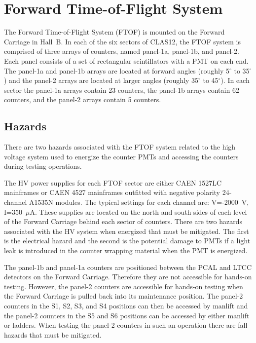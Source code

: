 \section{Forward Time-of-Flight System}

The Forward Time-of-Flight System (FTOF) is mounted on the Forward Carriage in Hall~B. 
In each of the six sectors of CLAS12, the FTOF system is comprised of three arrays of 
counters, named panel-1a, panel-1b, and panel-2. Each panel consists of a set of 
rectangular scintillators with a PMT on each end. The panel-1a and panel-1b arrays are 
located at forward angles (roughly 5$^\circ$ to 35$^\circ$) and the panel-2 arrays are 
located at larger angles (roughly $35^\circ$ to 45$^\circ$). In each sector the panel-1a 
arrays contain 23 counters, the panel-1b arrays contain 62 counters, and the panel-2 
arrays contain 5 counters.

\subsection{Hazards} 

There are two hazards associated with the FTOF system related to the high voltage system 
used to energize the counter PMTs and accessing the counters during testing operations.

The HV power supplies for each FTOF sector are either CAEN 1527LC mainframes or CAEN 4527 
mainframes outfitted with negative polarity 24-channel A1535N modules. The typical settings
for each channel are: V=-2000~V, I=350~$\mu$A. These supplies are located on the north and 
south sides of each level of the Forward Carriage behind each sector of counters. There are 
two hazards associated with the HV system when energized that must be mitigated. The first
is the electrical hazard and the second is the potential damage to PMTs if a light leak is
introduced in the counter wrapping material when the PMT is energized.

The panel-1b and panel-1a counters are positioned between the PCAL and LTCC detectors on 
the Forward Carriage. Therefore they are not accessible for hands-on testing. However, the 
panel-2 counters are accessible for hands-on testing when the Forward Carriage is pulled 
back into its maintenance position. The panel-2 counters in the S1, S2, S3, and S4 positions 
can then be accessed by manlift and the panel-2 counters in the S5 and S6 positions can be 
accessed by either manlift or ladders. When testing the panel-2 counters in such an operation 
there are fall hazards that must be mitigated.

